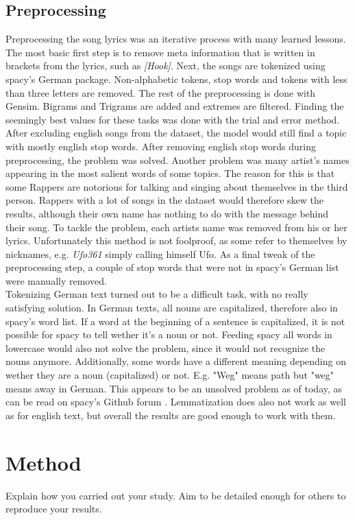 \documentclass[conference]{IEEEtran}
\begin{document}
\subsection{Preprocessing} \label{preprocessing}
Preprocessing the song lyrics was an iterative process with many learned lessons. The most basic first step is to remove meta information that is written in brackets from the lyrics, such as \textit{[Hook]}. Next, the songs are tokenized using spacy's German package. Non-alphabetic tokens, stop words and tokens with less than three letters are removed. The rest of the preprocessing is done with Gensim. Bigrams and Trigrams are added and extremes are filtered. Finding the seemingly best values for these tasks was done with the trial and error method.\\
After excluding english songs from the dataset, the model would still find a topic with mostly english stop words. After removing english stop words during preprocessing, the problem was solved. Another problem was many artist's names appearing in the most salient words of some topics. The reason for this is that some Rappers are notorious for talking and singing about themselves in the third person. Rappers with a lot of songs in the dataset would therefore skew the results, although their own name has nothing to do with the message behind their song. To tackle the problem, each artists name was removed from his or her lyrics. Unfortunately this method is not foolproof, as some refer to themselves by nicknames, e.g. \textit{Ufo361} simply calling himself Ufo. As a final tweak of the preprocessing step, a couple of stop words that were not in spacy's German list were manually removed.\\
Tokenizing German text turned out to be a difficult task, with no really satisfying solution. In German texts, all nouns are capitalized, therefore also in spacy's word list. If a word at the beginning of a sentence is capitalized, it is not possible for spacy to tell wether it's a noun or not. Feeding spacy all words in lowercase would also not solve the problem, since it would not recognize the nouns anymore. Additionally, some words have a different meaning depending on wether they are a noun (capitalized) or not. E.g. "Weg" means path but "weg" means away in German. This appears to be an unsolved problem as of today, as can be read on spacy's Github forum \cite{spacy_issues}. Lemmatization does also not work as well as for english text, but overall the results are good enough to work with them.

\section{Method}
Explain how you carried out your study. Aim to be detailed enough for
others to reproduce your results.
\end{document}
